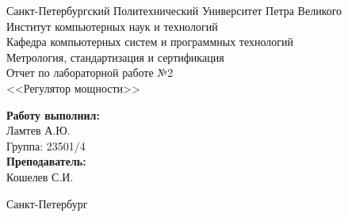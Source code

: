 \begin{titlepage}	%

	\begin{center}		%

		\normalsize Санкт-Петербургский Политехнический Университет Петра Великого\\
		\normalsize Институт компьютерных наук и технологий \\
		\normalsize Кафедра компьютерных систем и программных технологий\\[6cm]
		
		\Large Метрология, стандартизация и сертификация\\[0.5cm] %
		\normalsize Отчет по лабораторной работе №2\\[0.1cm]
		\normalsize <<Регулятор мощности>>\\[8cm]

	\end{center}


	\begin{flushright} %
		\begin{minipage}{0.30\textwidth} %
			\begin{flushleft} %

				\normalsize\textbf{Работу выполнил:}\\
				\normalsize Ламтев А.Ю.\\
				\normalsize {Группа:} 23501/4\\
				
				\normalsize \textbf{Преподаватель:}\\
				\normalsize Кошелев С.И.

			\end{flushleft}
		\end{minipage}
	\end{flushright}
	
	\vfill %

	\begin{center}
	\large Санкт-Петербург\\
	\large \the\year %
	\end{center} %

\thispagestyle{empty} %
\end{titlepage} %

\vfill %
